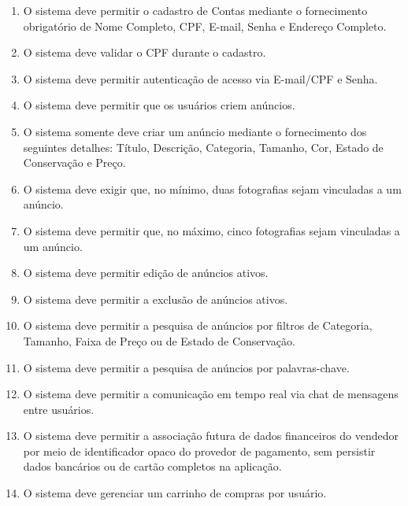 ﻿\documentclass[12pt,a4paper]{article}
\begin{document}
\begin{enumerate}[label=RF\arabic*:]

    \item O sistema deve permitir o cadastro de Contas mediante o fornecimento obrigatório de Nome Completo, CPF, E-mail, Senha e Endereço Completo.

    \item O sistema deve validar o CPF durante o cadastro.
    
    \item O sistema deve permitir autenticação de acesso via E-mail/CPF e Senha.

    \item O sistema deve permitir que os usuários criem anúncios.

    \item O sistema somente deve criar um anúncio mediante o fornecimento dos seguintes detalhes: Título, Descrição, Categoria, Tamanho, Cor, Estado de Conservação e Preço.

    \item O sistema deve exigir que, no mínimo, duas fotografias sejam vinculadas a um anúncio.

    \item O sistema deve permitir que, no máximo, cinco fotografias sejam vinculadas a um anúncio.

    \item O sistema deve permitir edição de anúncios ativos.

    \item O sistema deve permitir a exclusão de anúncios ativos. 

    \item O sistema deve permitir a pesquisa de anúncios por filtros de Categoria, Tamanho, Faixa de Preço ou de Estado de Conservação.

    \item O sistema deve permitir a pesquisa de anúncios por palavras-chave.

    \item O sistema deve permitir a comunicação em tempo real via chat de mensagens entre usuários.

    \item O sistema deve permitir a associação futura de dados financeiros do vendedor por meio de identificador opaco do provedor de pagamento, sem persistir dados bancários ou de cartão completos na aplicação.

    \item O sistema deve gerenciar um carrinho de compras por usuário.


\end{enumerate}
\end{document}
